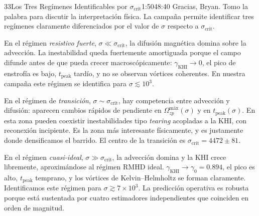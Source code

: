\documentclass[11pt,a4paper]{article}
\begin{document}
\begin{seborador}{33}{Los Tres Regímenes Identificables por $\sigma_\text{crit}$}{1:50}{48:40}
Gracias, Bryan. Tomo la palabra para discutir la interpretación física. La
campaña permite identificar tres regímenes claramente diferenciados por el
valor de $\sigma$ respecto a $\sigma_\text{crit}$.

En el régimen \emph{resistivo fuerte}, $\sigma\ll\sigma_\text{crit}$, la
difusión magnética domina sobre la advección. La inestabilidad queda
fuertemente amortiguada porque el campo difunde antes de que pueda crecer
macroscópicamente: $\gamma_\text{KHI}\to 0$, el pico de enstrofía es bajo,
$t_\text{peak}$ tardío, y no se observan vórtices coherentes. En nuestra
campaña este régimen se identifica para $\sigma\lesssim 10^3$.

En el régimen de \emph{transición}, $\sigma\sim\sigma_\text{crit}$, hay
competencia entre advección y difusión: aparecen cambios rápidos de pendiente
en $\Omega^\text{máx}_{zp}(\sigma)$ y en $t_\text{peak}(\sigma)$. En esta
zona pueden coexistir inestabilidades tipo \emph{tearing} acopladas a la KHI,
con reconexión incipiente. Es la zona más interesante físicamente, y es
justamente donde densificamos el barrido. El centro de la transición es
$\sigma_\text{crit}=4472\pm 81$.

En el régimen \emph{cuasi-ideal}, $\sigma\gg\sigma_\text{crit}$, la advección
domina y la KHI crece libremente, aproximándose al régimen RMHD ideal.
$\gamma_\text{KHI}\to\gamma_0=0.894$, el pico es alto, $t_\text{peak}$
temprano, y los vórtices de Kelvin--Helmholtz se forman claramente.
Identificamos este régimen para $\sigma\gtrsim 7\times 10^3$. La predicción
operativa es robusta porque está sustentada por cuatro estimadores
independientes que coinciden en orden de magnitud.
\end{seborador}
\end{document}

